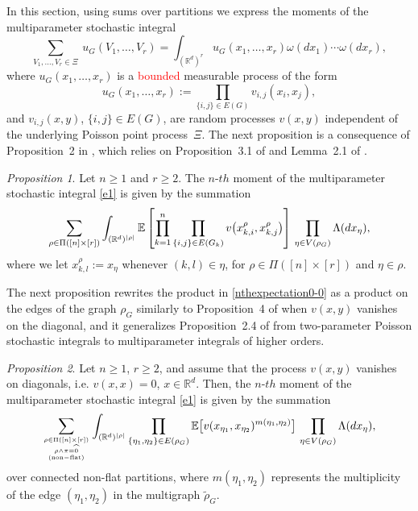 \documentclass[bj,authoryear,noshowframe]{imsart}
\theoremstyle{plain}
\theoremstyle{remark}
\newcommand{\E}{\mathbb{E}}
\newcommand{\R}{\mathbb{R}}
\def\real{{\mathord{\mathbb R}}}
\newtheorem{prop}{Proposition}[section]
\begin{document}
 In this section, using sums over partitions
 we express the moments of the multiparameter stochastic integral 
\begin{equation}
\label{e1}
 \sum_{V_1,\dots,V_r \in\Xi} \ u_G (V_1,\ldots , V_r ) 
 = \int_{(\real^d)^r} u_G (x_1,\ldots , x_r ) \omega (dx_1)\cdots \omega (dx_r), 
\end{equation} 
 where $u_G (x_1,\ldots , x_r )$ is a \textcolor{red}{bounded} measurable process of the form 
$$
 u_G (x_1,\ldots , x_r ) := \prod_{\{i,j\} \in E(G)} v_{i,j}(x_i,x_j), 
$$
 and $v_{i,j}(x,y)$, $\{i,j\}\in E(G)$,
 are random processes $v(x,y)$
 independent of the underlying Poisson point process~$\Xi$. 
 The next proposition is a consequence of Proposition~2 in \cite{prkhp}, 
which relies on Proposition~3.1 of \cite{momentpoi} %
and Lemma~2.1 of \cite{bogdan}. 
\begin{prop}
\label{p01-1-0} 
Let $n \geq 1$ and $r\geq 2$. 
The $n$-$th$ moment of the multiparameter stochastic integral
 \eqref{e1} is given by the summation 
\begin{equation} 
\label{nthexpectation0-0} 
\sum_{\rho \in \Pi ( [n] \times [r] )}
\int_{(\R^d )^{|\rho |}}
\E \left[
  \prod_{k=1}^n
\prod_{%
\{i,j\}\in E(G_k)}
v\big(x^\rho_{k,i},x^\rho_{k,j}\big) %
\right] 
   \ \! \prod_{\eta \in V(\rho_G)}
   \Lambda(dx_\eta ),
\end{equation}
 where we let $x_{k,l}^\rho:=x_\eta$ whenever $(k,l)\in \eta$,
 for $\rho \in \Pi([n]\times [r])$ and $\eta\in\rho$.
\end{prop}
 The next proposition rewrites the product in \eqref{nthexpectation0-0} 
 as a product on the edges of the graph $\rho_G$ 
 similarly to Proposition~4 of \cite{prkhp} when $v(x,y)$ vanishes on
 the diagonal, and it generalizes
 Proposition~2.4 of \cite{jansen}
 from two-parameter Poisson stochastic
 integrals to multiparameter integrals of higher orders. 
\begin{prop}
\label{p01-1-4} 
Let $n \geq 1$, $r\geq 2$, and assume that the process $v(x,y)$ vanishes
on diagonals, i.e. $v(x,x) = 0$, $x\in \real^d$. 
Then, the $n$-$th$ moment of the multiparameter stochastic integral
 \eqref{e1} is given by the summation 
\begin{equation} 
\nonumber %
\sum_{\rho \in \Pi ( [n] \times [r] )
\atop {
    \rho \wedge \pi = \widehat{0}
    \atop
        {\rm (non-flat)}
}
}
\int_{(\R^d )^{|\rho |}}
  \prod_{\{\eta_1,\eta_2\} \in E(\rho_G)}
 \E \big[ v(x_{\eta_1},x_{\eta_2})^{m({\eta_1,\eta_2})} \big] 
   \ \! \prod_{\eta \in V(\rho_G)}
\Lambda(dx_\eta ), 
\end{equation} 
over connected non-flat partitions,
where $m ({\eta_1,\eta_2})$ represents the multiplicity of the edge
$(\eta_1,\eta_2)$ in the multigraph $\widetilde{\rho}_G$. 
\end{prop}
\end{document}
